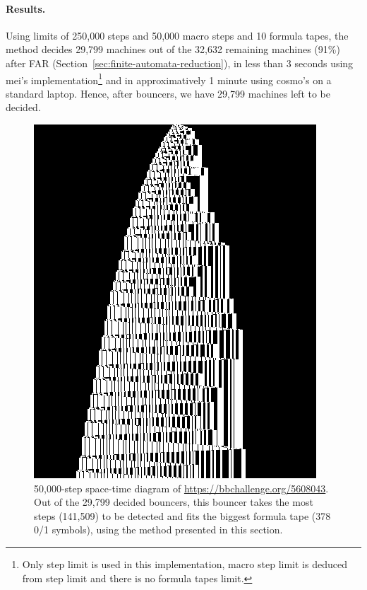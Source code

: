 \paragraph*{Results.} Using limits of 250,000 steps and 50,000 macro steps and 10 formula tapes, the method decides 29,799 machines out of the 32,632 remaining machines (91\%) after FAR (Section~\ref{sec:finite-automata-reduction}), in less than 3 seconds using mei's implementation\footnote{Only step limit is used in this implementation, macro step limit is deduced from step limit and there is no formula tapes limit.} and in approximatively 1 minute using cosmo's on a standard laptop. Hence, after bouncers, we have 29,799 machines left to be decided.

\begin{figure}[h!]
    \centering
    \includegraphics[scale=0.35]{figures/bouncers/5608043.png}
    \caption{\small 50,000-step space-time diagram of \url{https://bbchallenge.org/5608043}. Out of the 29,799 decided bouncers, this bouncer takes the most steps (141,509) to be detected and fits the biggest formula tape (378 0/1 symbols), using the method presented in this section.}\label{fig:big-bounce}
\end{figure}
\vspace{-2.5ex}
